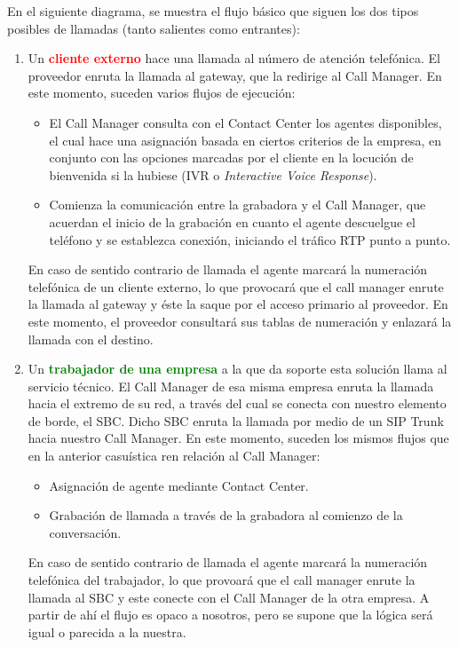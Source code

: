 \documentclass[a4paper, 12pt]{book}
\begin{document}
En el siguiente diagrama, se muestra el flujo básico que siguen los dos tipos posibles de llamadas (tanto salientes como entrantes):
\begin{enumerate}
  \item Un \textbf{\textcolor{red}{cliente externo}} hace una llamada al número de atención telefónica. El proveedor enruta la llamada al gateway, que la redirige al Call Manager. En este momento, suceden varios flujos de ejecución:
  \begin{itemize}
    \item El Call Manager consulta con el Contact Center los agentes disponibles, el cual hace una asignación basada en ciertos criterios de la empresa, en conjunto con las opciones marcadas por el cliente en la locución de bienvenida si la hubiese (IVR o \emph{Interactive Voice Response}).
    \item Comienza la comunicación entre la grabadora y el Call Manager, que acuerdan el inicio de la grabación en cuanto el agente descuelgue el teléfono y se establezca conexión, iniciando el tráfico RTP punto a punto.
  \end{itemize}
  En caso de sentido contrario de llamada el agente marcará la numeración telefónica de un cliente externo, lo que provocará que el call manager enrute la llamada al gateway y éste la saque por el acceso primario al proveedor. En este momento, el proveedor consultará sus tablas de numeración y enlazará la llamada con el destino.
  \item Un \textbf{\textcolor{green}{trabajador de una empresa}} a la que da soporte esta solución llama al servicio técnico. El Call Manager de esa misma empresa enruta la llamada hacia el extremo de su red, a través del cual se conecta con nuestro elemento de borde, el SBC. Dicho SBC enruta la llamada por medio de un SIP Trunk hacia nuestro Call Manager. En este momento, suceden los mismos flujos que en la anterior casuística ren relación al Call Manager:
  \begin{itemize}
    \item Asignación de agente mediante Contact Center.
    \item Grabación de llamada a través de la grabadora al comienzo de la conversación.
  \end{itemize}
  En caso de sentido contrario de llamada el agente marcará la numeración telefónica del trabajador, lo que provoará que el call manager enrute la llamada al SBC y este conecte con el Call Manager de la otra empresa. A partir de ahí el flujo es opaco a nosotros, pero se supone que la lógica será igual o parecida a la nuestra.
\end{enumerate}
\end{document}
